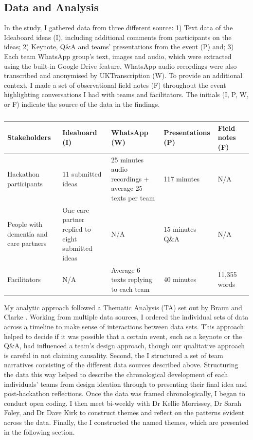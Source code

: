 \subsection{Data and Analysis}
\label{sec:DataAnalysis}
In the study, I gathered data from three different source: 1) Text data of the Ideaboard ideas (I), including additional comments from participants on the ideas; 2) Keynote, Q\&A and teams’ presentations from the event (P) and; 3) Each team WhatsApp group’s text, images and audio, which were extracted using the built-in Google Drive feature. WhatsApp audio recordings were also transcribed and anonymised by UKTranscription (W). To provide an additional context, I made a set of observational field notes (F) throughout the event highlighting conversations I had with teams and facilitators. The initials (I, P, W, or F) indicate the source of the data in the findings.

\begin{table}[ht]
\caption{}
\label{table:data collection}
\begin{tabularx}{\textwidth}{@{} Y|YYYYY @{}}
\textbf{Stakeholders} & \textbf{Ideaboard (I)} & \textbf{WhatsApp (W)} & \textbf{Presentations (P)} & \textbf{Field notes (F)} \\ \hline
Hackathon participants & 11 submitted ideas & 25 minutes audio recordings + average 25 texts per team & 117 minutes & N/A \\
People with dementia and care partners & One care partner replied to eight submitted ideas & N/A & 15 minutes Q\&A & N/A \\
Facilitators & N/A & Average 6 texts replying to each team & 40 minutes & 11,355 words \\
\end{tabularx}
\end{table}



My analytic approach followed a Thematic Analysis (TA) set out by Braun and Clarke \citep{braun_one_2020,braun_using_2006}. Working from multiple data sources, I ordered the individual sets of data across a timeline to make sense of interactions between data sets. This approach helped to decide if it was possible that a certain event, such as a keynote or the Q\&A, had influenced a team's design approach, though our qualitative approach is careful in not claiming causality. Second, the I structured a set of team narratives consisting of the different data sources described above. Structuring the data this way helped to describe the chronological development of each individuals’ teams from design ideation through to presenting their final idea and post-hackathon reflections.  Once the data was framed chronologically, I began to conduct open coding. I then meet bi-weekly with Dr Kellie Morrissey, Dr Sarah Foley, and Dr Dave Kirk to construct themes and reflect on the patterns evident across the data. Finally, the I constructed the named themes, which are presented in the following section. 

